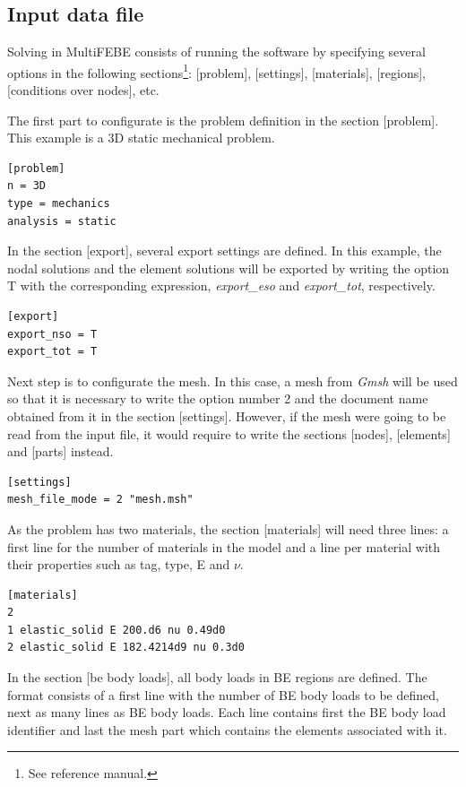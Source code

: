 \documentclass[a4]{article}
\begin{document}
\subsection{Input data file}
Solving in MultiFEBE consists of running the software by specifying several options in the following sections\footnote{See reference manual.}: [problem], [settings], [materials], [regions], [conditions over nodes], etc.

The first part to configurate is the problem definition in the section [problem]. This example is a 3D static mechanical problem.

\begin{Verbatim}	
[problem]
n = 3D
type = mechanics
analysis = static
\end{Verbatim}

In the section [export], several export settings are defined. In this example, the nodal solutions  and the element solutions will be exported by writing the option T with the corresponding expression, \textit{export\_eso} and \textit{export\_tot}, respectively.

\begin{Verbatim}
[export]
export_nso = T
export_tot = T
\end{Verbatim}

Next step is to configurate the mesh. In this case, a mesh from \textit{Gmsh} will be used so that it is necessary to write the option number 2 and the document name obtained from it in the section [settings]. However, if the mesh were going to be read from the input file, it would require to write the sections [nodes], [elements] and [parts] instead.

\begin{Verbatim}	
[settings]
mesh_file_mode = 2 "mesh.msh"
\end{Verbatim}

As the problem has two materials, the section [materials] will need three lines: a first line for the number of materials in the model and a line per material with their properties such as tag, type, E and $\nu$.

\begin{Verbatim}
[materials]
2
1 elastic_solid E 200.d6 nu 0.49d0
2 elastic_solid E 182.4214d9 nu 0.3d0
\end{Verbatim}

In the section [be body loads], all body loads in BE regions are defined. The format consists of a first line with the number of BE body loads to be defined, next as many lines as BE body loads. Each line contains first the BE body load identifier and last the mesh part which contains the elements associated with it.
\end{document}
